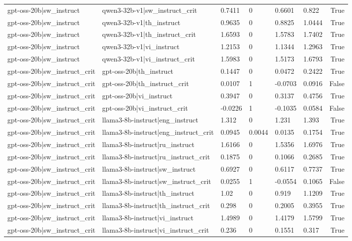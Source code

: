 \begin{table}
\begin{tabular}{llllllr}
gpt-oss-20b|sw_instruct & qwen3-32b-v1|sw_instruct_crit & 0.7411 & 0 & 0.6601 & 0.822 & True \\
gpt-oss-20b|sw_instruct & qwen3-32b-v1|th_instruct & 0.9635 & 0 & 0.8825 & 1.0444 & True \\
gpt-oss-20b|sw_instruct & qwen3-32b-v1|th_instruct_crit & 1.6593 & 0 & 1.5783 & 1.7402 & True \\
gpt-oss-20b|sw_instruct & qwen3-32b-v1|vi_instruct & 1.2153 & 0 & 1.1344 & 1.2963 & True \\
gpt-oss-20b|sw_instruct & qwen3-32b-v1|vi_instruct_crit & 1.5983 & 0 & 1.5173 & 1.6793 & True \\
gpt-oss-20b|sw_instruct_crit & gpt-oss-20b|th_instruct & 0.1447 & 0 & 0.0472 & 0.2422 & True \\
gpt-oss-20b|sw_instruct_crit & gpt-oss-20b|th_instruct_crit & 0.0107 & 1 & -0.0703 & 0.0916 & False \\
gpt-oss-20b|sw_instruct_crit & gpt-oss-20b|vi_instruct & 0.3947 & 0 & 0.3137 & 0.4756 & True \\
gpt-oss-20b|sw_instruct_crit & gpt-oss-20b|vi_instruct_crit & -0.0226 & 1 & -0.1035 & 0.0584 & False \\
gpt-oss-20b|sw_instruct_crit & llama3-8b-instruct|eng_instruct & 1.312 & 0 & 1.231 & 1.393 & True \\
gpt-oss-20b|sw_instruct_crit & llama3-8b-instruct|eng_instruct_crit & 0.0945 & 0.0044 & 0.0135 & 0.1754 & True \\
gpt-oss-20b|sw_instruct_crit & llama3-8b-instruct|ru_instruct & 1.6166 & 0 & 1.5356 & 1.6976 & True \\
gpt-oss-20b|sw_instruct_crit & llama3-8b-instruct|ru_instruct_crit & 0.1875 & 0 & 0.1066 & 0.2685 & True \\
gpt-oss-20b|sw_instruct_crit & llama3-8b-instruct|sw_instruct & 0.6927 & 0 & 0.6117 & 0.7737 & True \\
gpt-oss-20b|sw_instruct_crit & llama3-8b-instruct|sw_instruct_crit & 0.0255 & 1 & -0.0554 & 0.1065 & False \\
gpt-oss-20b|sw_instruct_crit & llama3-8b-instruct|th_instruct & 1.02 & 0 & 0.919 & 1.1209 & True \\
gpt-oss-20b|sw_instruct_crit & llama3-8b-instruct|th_instruct_crit & 0.298 & 0 & 0.2005 & 0.3955 & True \\
gpt-oss-20b|sw_instruct_crit & llama3-8b-instruct|vi_instruct & 1.4989 & 0 & 1.4179 & 1.5799 & True \\
gpt-oss-20b|sw_instruct_crit & llama3-8b-instruct|vi_instruct_crit & 0.236 & 0 & 0.1551 & 0.317 & True \\

\end{tabular}
\end{table}
